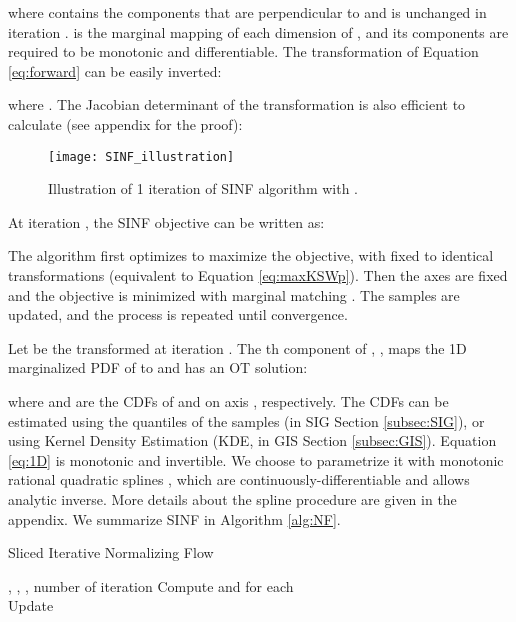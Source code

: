 \documentclass{article}
\begin{document}
where  contains the components that are perpendicular to  and is unchanged in iteration .  is the marginal mapping of each dimension of , and its components are required to be monotonic and differentiable. The transformation of Equation \ref{eq:forward} can be easily inverted:

where . The Jacobian determinant of the transformation is also efficient to calculate (see appendix for the proof):




\begin{figure}[t]
     \centering
      \texttt{[image: SINF\_illustration]}
     \caption{Illustration of 1 iteration of SINF algorithm with .}
     \label{fig:SINF}
     \vskip -0.1in
\end{figure}

At iteration , the SINF objective can be written as:

The algorithm first optimizes  to maximize the objective, with  fixed to identical transformations (equivalent to Equation \ref{eq:maxKSWp}). Then the axes  are fixed and the objective is minimized with  marginal matching . The samples are updated, and the process is repeated until convergence.  

Let  be the transformed  at iteration . The th component of , , maps the 1D marginalized PDF of  to  and has an OT solution:

where  and  are the CDFs of  and  on axis , respectively. The CDFs can be estimated using the quantiles of the samples (in SIG Section \ref{subsec:SIG}), or using Kernel Density Estimation (KDE, in GIS Section \ref{subsec:GIS}). Equation \ref{eq:1D} is monotonic and invertible. We choose to parametrize it with monotonic rational quadratic splines \citep{gregory1982piecewise, durkan2019neural}, which are continuously-differentiable and allows analytic inverse.  More details about the spline procedure are given in the appendix. We summarize SINF in Algorithm \ref{alg:NF}.

\begin{algorithm}[tb]
   \caption{Sliced Iterative Normalizing Flow}
   \label{alg:NF}
\begin{algorithmic}
    , , , number of iteration 
   \STATE 
   \STATE  
   \STATE Compute  and  for each  
   \STATE \\ 
   \STATE 
   \ENDFOR
   \STATE 
   \STATE Update  
   \ENDFOR
\end{algorithmic}
\end{algorithm}
\end{document}
